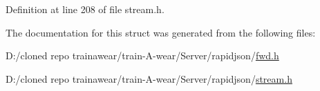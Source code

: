 Definition at line 208 of file stream.\+h.



The documentation for this struct was generated from the following files\+:\begin{DoxyCompactItemize}
\item 
D\+:/cloned repo trainawear/train-\/\+A-\/wear/\+Server/rapidjson/\mbox{\hyperlink{fwd_8h}{fwd.\+h}}\item 
D\+:/cloned repo trainawear/train-\/\+A-\/wear/\+Server/rapidjson/\mbox{\hyperlink{stream_8h}{stream.\+h}}\end{DoxyCompactItemize}
